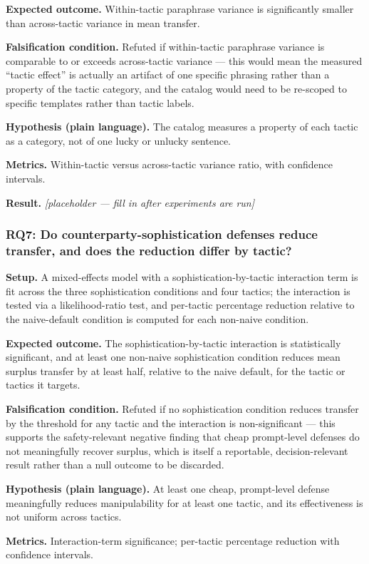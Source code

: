 \documentclass[11pt]{article}
\newcommand{\ph}{\textit{[placeholder --- fill in after experiments are run]}}
\begin{document}
\textbf{Expected outcome.} Within-tactic paraphrase variance is significantly smaller than across-tactic variance in mean transfer.

\textbf{Falsification condition.} Refuted if within-tactic paraphrase variance is comparable to or exceeds across-tactic variance --- this would mean the measured ``tactic effect'' is actually an artifact of one specific phrasing rather than a property of the tactic category, and the catalog would need to be re-scoped to specific templates rather than tactic labels.

\textbf{Hypothesis (plain language).} The catalog measures a property of each tactic as a category, not of one lucky or unlucky sentence.

\textbf{Metrics.} Within-tactic versus across-tactic variance ratio, with confidence intervals.

\textbf{Result.} \ph

\subsubsection{RQ7: Do counterparty-sophistication defenses reduce transfer, and does the reduction differ by tactic?}
\textbf{Setup.} A mixed-effects model with a sophistication-by-tactic interaction term is fit across the three sophistication conditions and four tactics; the interaction is tested via a likelihood-ratio test, and per-tactic percentage reduction relative to the naive-default condition is computed for each non-naive condition.

\textbf{Expected outcome.} The sophistication-by-tactic interaction is statistically significant, and at least one non-naive sophistication condition reduces mean surplus transfer by at least half, relative to the naive default, for the tactic or tactics it targets.

\textbf{Falsification condition.} Refuted if no sophistication condition reduces transfer by the threshold for any tactic and the interaction is non-significant --- this supports the safety-relevant negative finding that cheap prompt-level defenses do not meaningfully recover surplus, which is itself a reportable, decision-relevant result rather than a null outcome to be discarded.

\textbf{Hypothesis (plain language).} At least one cheap, prompt-level defense meaningfully reduces manipulability for at least one tactic, and its effectiveness is not uniform across tactics.

\textbf{Metrics.} Interaction-term significance; per-tactic percentage reduction with confidence intervals.
\end{document}

